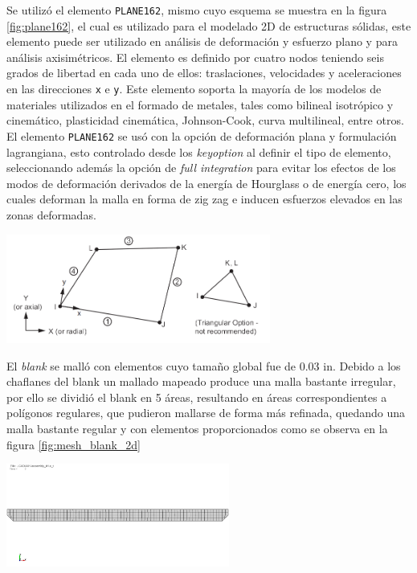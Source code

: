 Se utilizó el elemento \texttt{PLANE162}, mismo cuyo esquema se muestra en la figura \ref{fig:plane162}, 
el cual es utilizado para el modelado 2D de estructuras sólidas, este elemento puede ser utilizado en 
análisis de deformación y esfuerzo plano y para análisis axisimétricos. El elemento es definido por 
cuatro nodos teniendo seis grados de libertad en cada uno de ellos: traslaciones, velocidades y 
aceleraciones en las direcciones \texttt{x} e \texttt{y}. Este elemento soporta la mayoría de los modelos 
de materiales utilizados en el formado de metales, tales como bilineal isotrópico y cinemático, plasticidad 
cinemática, Johnson-Cook, curva multilineal, entre otros. \\

El elemento \texttt{PLANE162} se usó con la opción de deformación plana y formulación lagrangiana, esto controlado 
desde los \textit{keyoption} al definir el tipo de elemento, seleccionando además la opción de \textit{full integration} 
para evitar los efectos de los modos de deformación derivados de la energía de Hourglass o de energía cero, los cuales 
deforman la malla en forma de zig zag e inducen esfuerzos elevados en las zonas deformadas.\\

\begin{center}
\includegraphics[width=0.65\textwidth]{src/ch3/plane162.png}
\label{fig:plane162}
\end{center}

El \textit{blank} se malló con elementos cuyo tamaño global fue de 0.03 in. Debido a los chaflanes del blank 
un mallado mapeado produce una malla bastante irregular, por ello se dividió el blank en 5 áreas, resultando 
en áreas correspondientes a polígonos regulares, que pudieron mallarse de forma más refinada, quedando una malla 
bastante regular y con elementos proporcionados como se observa en la figura \ref{fig:mesh_blank_2d}

\begin{center}
\includegraphics[width=0.55\textwidth]{src/ch3/mesh_blank_2d.png}
\label{fig:mesh_blank_2d}
\end{center}

